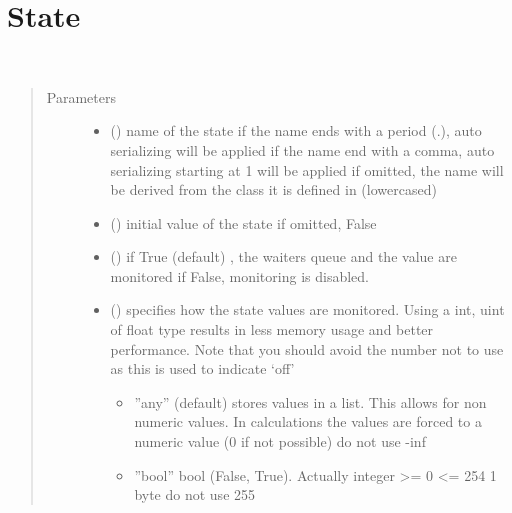 \documentclass[letterpaper,10pt,english]{sphinxmanual}
\begin{document}
\section{State}
\label{\detokenize{Reference:state}}

\begin{fulllineitems}
\label{\detokenize{Reference:salabim.State}}~\begin{quote}\begin{description}
\item[{Parameters}] \leavevmode\begin{itemize}
\item {} 
 () \textendash{} name of the state 
if the name ends with a period (.),
auto serializing will be applied 
if the name end with a comma,
auto serializing starting at 1 will be applied 
if omitted, the name will be derived from the class
it is defined in (lowercased)

\item {} 
 (\sphinxstyleliteralemphasis{, }) \textendash{} initial value of the state 
if omitted, False

\item {} 
 () \textendash{} if True (default) , the waiters queue and the value are monitored 
if False, monitoring is disabled.

\item {} 
 () \textendash{} 
specifies how the state values are monitored. Using a
int, uint of float type results in less memory usage and better
performance. Note that you should avoid the number not to use
as this is used to indicate ‘off’
\begin{itemize}
\item {} 
”any” (default) stores values in a list. This allows for
non numeric values. In calculations the values are
forced to a numeric value (0 if not possible) do not use -inf

\item {} 
”bool” bool (False, True). Actually integer \textgreater{}= 0 \textless{}= 254 1 byte do not use 255


\end{itemize}
\end{itemize}
\end{description}
\end{quote}
\end{fulllineitems}
\end{document}

